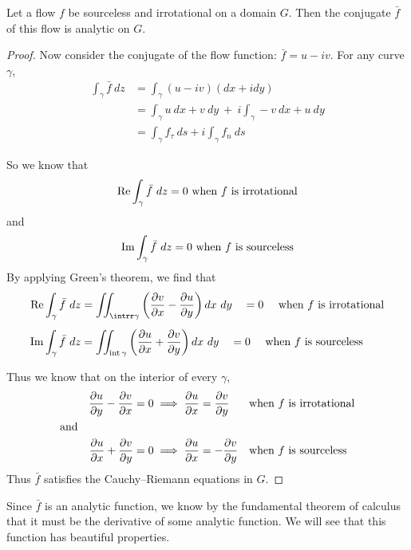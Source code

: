 \documentclass[letterpaper, twoside, 12 pt]{article}
\begin{document}
	\begin{theorem}
		Let a flow $f$ be sourceless and irrotational on a domain $G$.
		Then the conjugate $\bar f$ of this flow is analytic on $G$.
	\end{theorem}
	\begin{proof}
		Now consider the conjugate of the flow function: $\bar f = u - i v$.
		For any curve $\gamma$, 
		\begin{align*}
			\int_\gamma \bar f \ dz &= \int_\gamma (u - iv) (dx + i dy) \\
			&= \int_\gamma u\> dx + v\> dy \ + \ i \! \int_\gamma -v \> dx + u \> dy\\
			&= \int_\gamma f_\tau \ ds + i \int_\gamma f_n \ ds
		\end{align*}

		So we know that 
		\[
			\re \int_\gamma \bar f \ dz = 0 \text{ when $f$ is irrotational}
		\]
		and
		\[
			\operatorname*{Im} \int_\gamma \bar f \ dz = 0 \text{ when $f$ is sourceless}
		\]
		By applying Green's theorem, we find that 
		\begin{align*}
			\re \int_\gamma \bar f \ dz &= \iint_{\intrr \gamma} \left( \frac{\partial v}{\partial x} - \frac{\partial u}{\partial y} \right) dx\ dy 
			\quad = 0 \quad \text{ when $f$ is irrotational}\\[1 ex]
			\im \int_\gamma \bar f \ dz &= \iint_{\intr \gamma} \left( \frac{\partial u}{\partial x} + \frac{\partial v}{\partial y} \right) dx\ dy 
			\quad = 0 \quad \text{ when $f$ is sourceless}
		\end{align*}

		Thus we know that on the interior of every $\gamma$, 
		\begin{align*}
			\frac{\partial u}{\partial y} - \frac{\partial v}{\partial x} &= 0 \implies \frac{\partial u}{\partial x} = \frac{\partial v}{\partial y} & &\text{when $f$ is irrotational} \\
			\text{and}\hspace{5 em}&\\
			\frac{\partial u}{\partial x} + \frac{\partial v}{\partial y} &= 0 \implies \frac{\partial u}{\partial x} = - \frac{\partial v}{\partial y} & &\text{when $f$ is sourceless} \\
		\end{align*}
		Thus $\bar f$ satisfies the Cauchy--Riemann equations in $G$.
	\end{proof}

	Since $\bar f$ is an analytic function, we know by the fundamental theorem of calculus that it must be the derivative of some analytic function.
	We will see that this function has beautiful properties.
\end{document}
